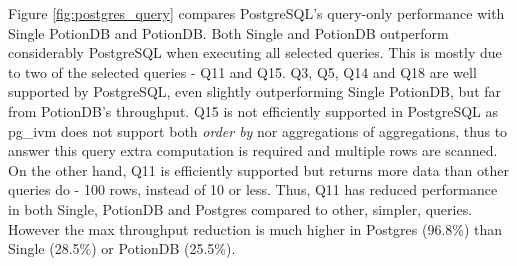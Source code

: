 \documentclass[sigplan,twocolumn,review,anonymous]{acmart}
\begin{document}

Figure \ref{fig:postgres_query} compares PostgreSQL's query-only performance with Single PotionDB and PotionDB.
Both Single and PotionDB outperform considerably PostgreSQL when executing all selected queries.
This is mostly due to two of the selected queries - Q11 and Q15.
Q3, Q5, Q14 and Q18 are well supported by PostgreSQL, even slightly outperforming Single PotionDB, but far from PotionDB's throughput.
Q15 is not efficiently supported in PostgreSQL as pg\_ivm does not support both \emph{order by} nor aggregations of aggregations, thus to answer this query extra computation is required and multiple rows are scanned. %
On the other hand, Q11 is efficiently supported but returns more data than other queries do - 100 rows, instead of 10 or less.
Thus, Q11 has reduced performance in both Single, PotionDB and Postgres compared to other, simpler, queries. 
However the max throughput reduction is much higher in Postgres (96.8\%) than Single (28.5\%) or PotionDB (25.5\%). %
\end{document}
